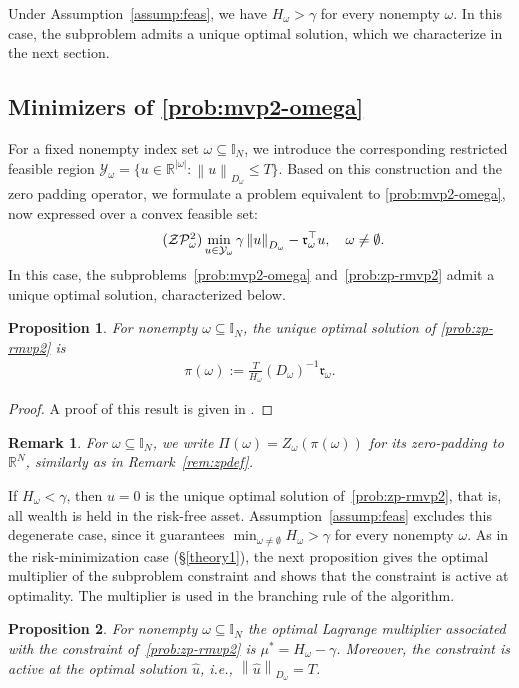 \documentclass[11pt]{article}
\theoremstyle{plain}
\newtheorem{proposition}{Proposition}
\theoremstyle{definition}
\theoremstyle{plain}
\newtheorem{remark}{Remark}
\newcommand{\RR}{{\mathbb R}} %
\newcommand{\II}{{\mathbb I}}
\newcommand{\norm}[1]{\left\lVert#1\right\rVert}
\newcommand{\abs}[1]{\left\lvert#1\right\rvert}
\newcommand{\tpose}[1]{#1^{\top}}
\newcommand{\cP}{{\mathcal P}}
\newcommand{\ccr}{{\mathfrak r}}
\newcommand{\cY}{{\mathcal Y}}
\newcommand{\cZ}{{\mathcal Z}}
\begin{document}
Under Assumption~\ref{assump:feas}, we have $H_\omega>\gamma$ for every nonempty $\omega$. In this case, the subproblem admits a unique optimal solution, which we characterize in the next section.
\subsection{Minimizers of \texorpdfstring{\eqref{prob:mvp2-omega}}{P2w}}
For a fixed nonempty index set $\omega\subseteq\II_N$, we introduce the corresponding restricted feasible region
$\cY_\omega=\{u\in\RR^{\abs{\omega}}:\norm{u}_{D_\omega}\leq T\}$. Based on this construction and the zero padding operator, we formulate a problem equivalent to \eqref{prob:mvp2-omega}, now expressed over a convex feasible set:
\begin{align}\tag{$\cZ\cP^2_\omega$}\label{prob:zp-rmvp2}
\min_{u\in \cY_\omega}\gamma\norm{u}_{D_\omega}-\tpose{\ccr_{\omega}}u, \quad \omega\neq \emptyset.
\end{align}
In this case, the subproblems~\eqref{prob:mvp2-omega} and~\eqref{prob:zp-rmvp2} admit a unique optimal solution, characterized below.
\begin{proposition}\label{prop:xi2}
For nonempty $\omega \subseteq \II_N$, the unique optimal solution of \eqref{prob:zp-rmvp2} is
\begin{align*}
\pi(\omega):=\frac{T}{H_\omega}(D_\omega)^{-1}\ccr_\omega.
\end{align*}
\end{proposition}
\begin{proof}
    A proof of this result is given in \cite[Proposition~2]{Pinar2016}.
\end{proof}
\begin{remark}
    For $\omega\subseteq\mathbb{I}_N$, we write $\Pi(\omega)=Z_\omega(\pi(\omega))$ for its zero-padding to $\mathbb{R}^N$, similarly as in Remark~\ref{rem:zpdef}.
\end{remark}
If $H_\omega<\gamma$, then $u=0$ is the unique optimal solution of~\eqref{prob:zp-rmvp2}, that is, all wealth is held in the risk-free asset. Assumption~\ref{assump:feas} excludes this degenerate case, since it guarantees $\min_{\omega\neq\emptyset} H_\omega > \gamma$ for every nonempty $\omega$.
As in the risk-minimization case (\S\ref{theory1}), the next proposition gives the optimal multiplier of the subproblem constraint and shows that the constraint is active at optimality. The multiplier is used in the branching rule of the algorithm.
\begin{proposition}\label{prop:dual_solution_subproblem}
For nonempty $\omega\subseteq \II_N$ the optimal Lagrange multiplier associated with the constraint of~\eqref{prob:zp-rmvp2} is $\mu^* = H_\omega- \gamma$. Moreover, the constraint is active at the optimal solution $\hat u$, \textit{i.e.}, $\norm{\hat{u}}_{D_\omega}=T$.
\end{proposition}
\end{document}

